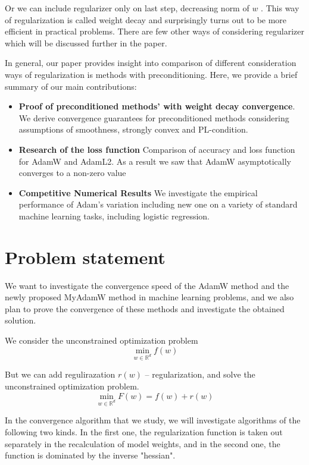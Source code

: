 \documentclass{article}
\begin{document}
Or we can include regularizer only on last step, decreasing norm of $w$ \citep{loshchilov2017decoupled}.
This way of regularization is called weight decay and surprisingly turns out to be more efficient in practical problems.
There are few other ways of considering regularizer which will be discussed further in the paper.

In general, our paper provides insight into comparison of different consideration ways of regularization is methods with preconditioning. Here, we provide a brief summary of our main contributions:

\begin{itemize}
    \item \textbf{Proof of preconditioned methods' with weight decay convergence}.  We derive convergence guarantees for preconditioned methods considering assumptions of smoothness, strongly convex and PL-condition.
    
    \item \textbf{Research of the loss function} Comparison of accuracy and loss function for AdamW and AdamL2. As a result we saw that AdamW asymptotically converges to a non-zero value
    
    \item \textbf{Competitive Numerical Results} We investigate the empirical performance of Adam's variation including new one on a variety of standard machine learning tasks, including logistic regression.
\end{itemize}

\section{Problem statement}
We want to investigate the convergence speed of the AdamW method and the newly proposed MyAdamW method in machine learning problems, and we also plan to prove the convergence of these methods and investigate the obtained solution.

We consider the unconstrained optimization problem
\begin{equation*}
	\min_{w \in \mathbb{R}^d} f(w)
\end{equation*}

But we can add regulirazation $r(w)$ -- regularization, and solve the unconstrained optimization problem.
\begin{equation*}
	\min_{w \in \mathbb{R}^d} F(w) = f(w) + r(w)
\end{equation*}

In the convergence algorithm that we study, we will investigate algorithms of the following two kinds. In the first one, the regularization function is taken out separately in the recalculation of model weights, and in the second one, the function is dominated by the inverse "hessian".
\end{document}
